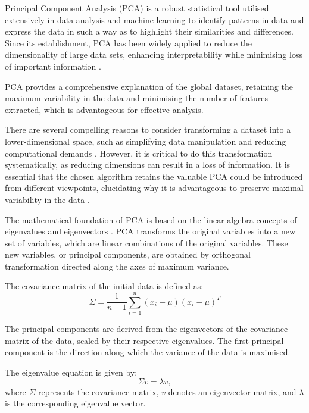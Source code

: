 \documentclass[conference]{IEEEtran}
\begin{document}
Principal Component Analysis (PCA) is a robust statistical tool utilised extensively in data analysis and machine learning to identify patterns in data and express the data in such a way as to highlight their similarities and differences. Since its establishment, PCA has been widely applied to reduce the dimensionality of large data sets, enhancing interpretability while minimising loss of important information \cite{jolliffe2016principal, monahan2000nonlinear, takane2001constrained, maroco2018, watkins2018}.

PCA provides a comprehensive explanation of the global dataset, retaining the maximum variability in the data and minimising the number of features extracted, which is advantageous for effective analysis.

There are several compelling reasons to consider transforming a dataset into a lower-dimensional space, such as simplifying data manipulation and reducing computational demands \cite{wang2003feature, wu2007feature, correiaICIE}. However, it is critical to do this transformation systematically, as reducing dimensions can result in a loss of information. It is essential that the chosen algorithm retains the valuable PCA could be introduced from different viewpoints, elucidating why it is advantageous to preserve maximal variability in the data \cite{hasan2021review, ivosev2008dimensionality, bro2014principal}.

The mathematical foundation of PCA is based on the linear algebra concepts of eigenvalues and eigenvectors \cite{wold1987principal}. PCA transforms the original variables into a new set of variables, which are linear combinations of the original variables. These new variables, or principal components, are obtained by orthogonal transformation directed along the axes of maximum variance.

The covariance matrix of the initial data is defined as:
\[
\Sigma = \frac{1}{n-1} \sum_{i=1}^{n} (x_i - \mu)(x_i - \mu)^T
\]


The principal components are derived from the eigenvectors of the covariance matrix of the data, scaled by their respective eigenvalues. The first principal component is the direction along which the variance of the data is maximised.

The eigenvalue equation is given by:
\[
\Sigma v = \lambda v,
\]
where $\Sigma$ represents the covariance matrix, $v$ denotes an eigenvector matrix, and $\lambda$ is the corresponding eigenvalue vector.

\end{document}
